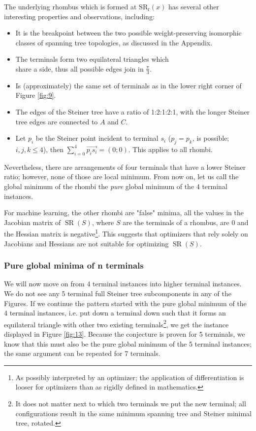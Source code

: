 \documentclass{mpaper}
\begin{document}
The underlying rhombus which is formed at $\operatorname{SR_r}(x)$ has several other interesting properties and observations, including:
\begin{itemize}
  \item It is the breakpoint between the two possible weight-preserving isomorphic classes of spanning tree topologies, as discussed in the Appendix. %
  \item The terminals form two equilateral triangles which\\share a side, thus all possible edges join in $\frac{\pi}{3}$.
  \item Is (approximately) the same set of terminals as in the lower right corner of Figure \ref{fig:9}.
  \item The edges of the Steiner tree have a ratio of 1:2:1:2:1, with the longer Steiner tree edges are connected to $A$ and $C$. 
  \item Let $p_i$ be the Steiner point incident to terminal $s_i$ ($p_j=p_k$, is possible; $i,j,k \leq 4$), then $\sum\limits_{i=0}^4\overrightarrow{p_is_i}=(0;0)$. This applies to all rhombi.
\end{itemize}

Nevertheless, there are arrangements of four terminals that have a lower Steiner ratio; however, none of those are local minimum. From now on, let us call the global minimum of the rhombi the  \emph{pure} global minimum of the 4 terminal instances. 

For machine learning, the other rhombi are "false" minima, all the values in the Jacobian matrix of $\operatorname{SR}(S)$, where $S$ are the terminals of a rhombus, are 0 and the Hessian matrix is negative\footnote{As possibly interpreted by an optimizer; the application of differentiation is looser for optimizers than as rigidly defined in mathematics.}. This suggests that optimizers that rely solely on Jacobians and Hessians are not suitable for optimizing $\operatorname{SR}(S)$.

\subsubsection{Pure global minima of n terminals}\label{sec:pgm}
We will now move on from 4 terminal instances into higher terminal instances. We do not see any 5 terminal full Steiner tree subcomponents in any of the Figures. If we continue the pattern started with the pure global minimum of the 4 terminal instances, i.e. put down a terminal down such that it forms an equilateral triangle with other two existing terminals\footnote{It does not matter next to which two terminals we put the new terminal; all configurations result in the same minimum spanning tree and Steiner minimal tree, rotated.}, we get the instance displayed in Figure \ref{fig:13}. Because the conjecture is proven for 5 terminals, we know that this must also be the pure global minimum of the 5 terminal instances; the same argument can be repeated for 7 terminals.
\end{document}
